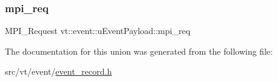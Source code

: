 \subsubsection{\texorpdfstring{mpi\+\_\+req}{mpi\_req}}
{\footnotesize\ttfamily M\+P\+I\+\_\+\+Request vt\+::event\+::u\+Event\+Payload\+::mpi\+\_\+req}



The documentation for this union was generated from the following file\+:\begin{DoxyCompactItemize}
\item 
src/vt/event/\hyperlink{event__record_8h}{event\+\_\+record.\+h}\end{DoxyCompactItemize}
